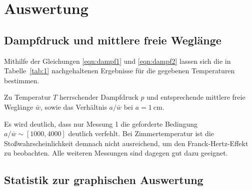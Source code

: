 \section{Auswertung}
\label{sec:auswertung}

\subsection{Dampfdruck und mittlere freie Weglänge}

Mithilfe der Gleichungen \eqref{eqn:dampf1} und \eqref{eqn:dampf2} lassen sich die in Tabelle~\ref{tab:1} nachgehaltenen Ergebnisse
für die gegebenen Temperaturen bestimmen.

\begin{table}[H]
	\centering
	\caption{Zu Temperatur $T$ herrschender Dampfdruck $p$ und entsprechende mittlere freie Weglänge $\bar{w}$, sowie das Verhältnis $a / \bar{w}$ bei $a = \qty{1}{\centi\meter}$.}
	\makebox[\textwidth][c]{}
	\label{tab:1}
\end{table}

Es wird deutlich, dass nur Messung 1 die geforderte Bedingung $a / \bar{w} \sim [1000, 4000]$ deutlich verfehlt. Bei Zimmertemperatur ist die
Stoßwahrscheinlichkeit demnach nicht ausreichend, um den Franck-Hertz-Effekt zu beobachten. Alle weiteren Messungen sind dagegen gut dazu geeignet.

\subsection{Statistik zur graphischen Auswertung}


